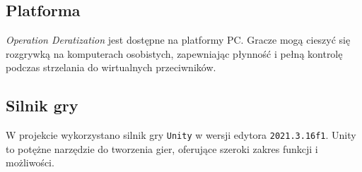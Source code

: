 \subsection{Platforma}
\textit{Operation Deratization} jest dostępne na platformy PC. Gracze mogą cieszyć się rozgrywką na komputerach osobistych, zapewniając płynność i pełną kontrolę podczas strzelania do wirtualnych przeciwników.

\subsection{Silnik gry}
W projekcie wykorzystano silnik gry \texttt{Unity} w wersji edytora \texttt{2021.3.16f1}. Unity to potężne narzędzie do tworzenia gier, oferujące szeroki zakres funkcji i możliwości. 